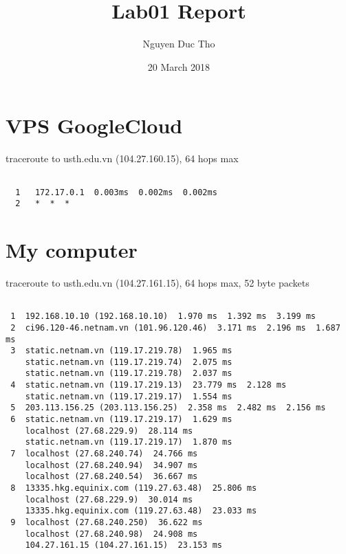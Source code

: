 \documentclass{article}
\title{Lab01 Report}
\author{Nguyen Duc Tho}
\date{20 March 2018}
\begin{document}
\maketitle



\section{VPS GoogleCloud}
traceroute to usth.edu.vn (104.27.160.15), 64 hops max\linebreak

\begin{lstlisting}

  1   172.17.0.1  0.003ms  0.002ms  0.002ms
  2   *  *  *
\end{lstlisting}

\section{My computer}
traceroute to usth.edu.vn (104.27.161.15), 64 hops max, 52 byte packets\linebreak
\begin{lstlisting}

 1  192.168.10.10 (192.168.10.10)  1.970 ms  1.392 ms  3.199 ms
 2  ci96.120-46.netnam.vn (101.96.120.46)  3.171 ms  2.196 ms  1.687 ms
 3  static.netnam.vn (119.17.219.78)  1.965 ms
    static.netnam.vn (119.17.219.74)  2.075 ms
    static.netnam.vn (119.17.219.78)  2.037 ms
 4  static.netnam.vn (119.17.219.13)  23.779 ms  2.128 ms
    static.netnam.vn (119.17.219.17)  1.554 ms
 5  203.113.156.25 (203.113.156.25)  2.358 ms  2.482 ms  2.156 ms
 6  static.netnam.vn (119.17.219.17)  1.629 ms
    localhost (27.68.229.9)  28.114 ms
    static.netnam.vn (119.17.219.17)  1.870 ms
 7  localhost (27.68.240.74)  24.766 ms
    localhost (27.68.240.94)  34.907 ms
    localhost (27.68.240.54)  36.667 ms
 8  13335.hkg.equinix.com (119.27.63.48)  25.806 ms
    localhost (27.68.229.9)  30.014 ms
    13335.hkg.equinix.com (119.27.63.48)  23.033 ms
 9  localhost (27.68.240.250)  36.622 ms
    localhost (27.68.240.98)  24.908 ms
    104.27.161.15 (104.27.161.15)  23.153 ms
\end{lstlisting}
\end{document}
